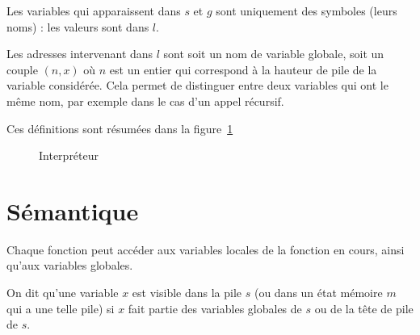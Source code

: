 Les variables qui apparaissent dans $s$ et $g$ sont uniquement des symboles
(leurs noms) : les valeurs sont dans $l$.

Les adresses intervenant dans $l$ sont soit un nom de variable globale, soit un
couple $(n, x)$ où $n$ est un entier qui correspond à la hauteur de pile de la
variable considérée. Cela permet de distinguer entre deux variables qui ont le
même nom, par exemple dans le cas d'un appel récursif.

Ces définitions sont résumées dans la figure~\ref{fig:interp}

\begin{figure}





  \caption{Interpréteur}
  \label{fig:interp}
\end{figure}

\section{Sémantique}

Chaque fonction peut accéder aux variables locales de la fonction en cours,
ainsi qu'aux variables globales.

\begin{definition}[Visibilité]
  On dit qu'une variable $x$ est visible dans la pile $s$ (ou dans un état
  mémoire $m$ qui a une telle pile) si $x$ fait partie des variables globales de
  $s$ ou de la tête de pile de $s$.
\end{definition}

